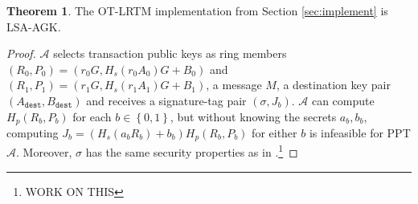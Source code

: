 \documentclass{mrl}
\theoremstyle{definition}
\newtheorem{theorem}{Theorem}[subsection]
\begin{document}
  \begin{theorem} The OT-LRTM implementation from Section \ref{sec:implement} is LSA-AGK.
  \end{theorem}
  \begin{proof}
  $\mathcal{A}$ selects transaction public keys as ring members $(R_0, P_0) = (r_0 G, H_s(r_0 A_0)G + B_0)$ and $(R_1, P_1) = (r_1 G, H_s(r_1 A_1)G + B_1)$, a message $M$, a destination key pair $(A_{\texttt{dest}}, B_{\texttt{dest}})$ and receives a signature-tag pair  $(\sigma, J_b)$.  $\mathcal{A}$ can compute $H_p(R_b, P_b)$ for each $b \in \left\{0,1\right\}$, but without knowing the secrets $a_b, b_b$, computing $J_b = (H_s(a_b R_b) + b_b)H_p(R_b, P_b)$ for either $b$ is infeasible for PPT $\mathcal{A}$. Moreover, $\sigma$ has the same security properties as in \cite{liu2004linkable}.\footnote{WORK ON THIS}
  \end{proof}
 
\end{document}
